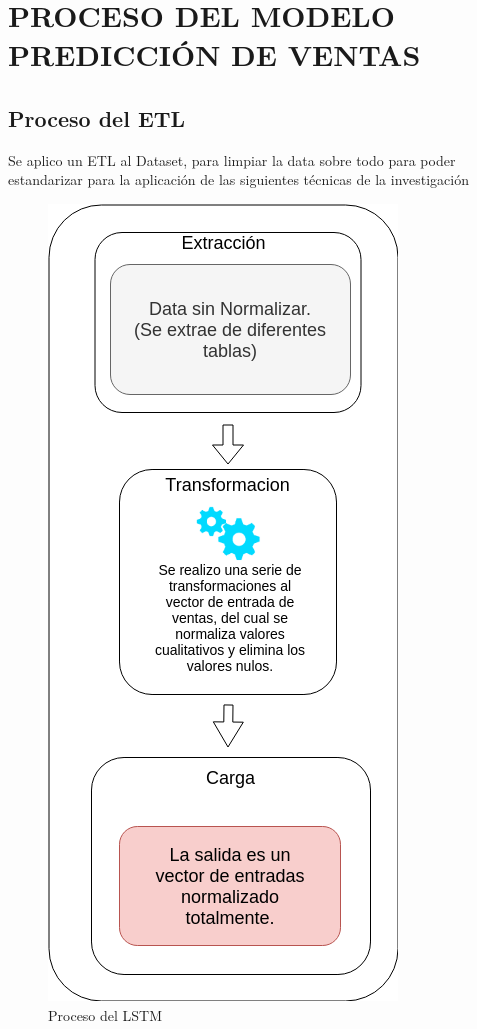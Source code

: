 \documentclass[conference]{IEEEtran}
\begin{document}
\section{PROCESO DEL MODELO PREDICCIÓN DE VENTAS}
\subsection{Proceso del ETL}
Se aplico un ETL al Dataset, para limpiar la data sobre todo para poder estandarizar para la aplicación de las siguientes técnicas de la investigación\\

\begin{figure}[H]
    \centering
    \includegraphics[scale=0.4]{ETL}
    \caption{Proceso del LSTM}
    \label{fig:proceso_etl}
\end{figure}
\end{document}
